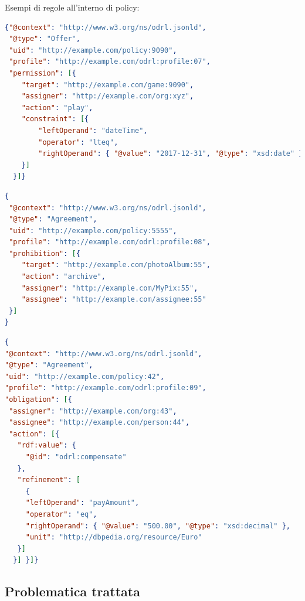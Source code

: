 \documentclass[12pt,a4paper,twoside]{book}
\begin{document}
Esempi di regole all'interno di policy:
\begin{lstlisting}[language=json,firstnumber=1,caption={La regola esprime il permesso di eseguire l'azione \textbf{play} sul target fino al giorno 2017-12-31 compreso},captionpos=b,label=esempioPerm]
{"@context": "http://www.w3.org/ns/odrl.jsonld",
 "@type": "Offer",
 "uid": "http://example.com/policy:9090",
 "profile": "http://example.com/odrl:profile:07",
 "permission": [{
    "target": "http://example.com/game:9090",
    "assigner": "http://example.com/org:xyz",
    "action": "play",
    "constraint": [{
        "leftOperand": "dateTime",
        "operator": "lteq",
        "rightOperand": { "@value": "2017-12-31", "@type": "xsd:date" }
    }]
  }]}
\end{lstlisting}
\begin{lstlisting}[language=json,firstnumber=1,caption={La regola esprime il divieto di eseguire l'azione \textbf{archive} sul target},captionpos=b,label=esempioPro]
{
 "@context": "http://www.w3.org/ns/odrl.jsonld",
 "@type": "Agreement",
 "uid": "http://example.com/policy:5555",
 "profile": "http://example.com/odrl:profile:08",
 "prohibition": [{
	"target": "http://example.com/photoAlbum:55",
	"action": "archive",
	"assigner": "http://example.com/MyPix:55",
	"assignee": "http://example.com/assignee:55"
 }]
}
\end{lstlisting}

\begin{lstlisting}[language=json,firstnumber=1,caption={La regola esprime l'obbligo di eseguire l'azione \textbf{compensate}, specificando come \textbf{refinement} l'ammontare del pagamento},captionpos=b,label=esempioDuty]
{
"@context": "http://www.w3.org/ns/odrl.jsonld",
"@type": "Agreement",
"uid": "http://example.com/policy:42",
"profile": "http://example.com/odrl:profile:09",
"obligation": [{
 "assigner": "http://example.com/org:43",
 "assignee": "http://example.com/person:44",
 "action": [{
   "rdf:value": {
     "@id": "odrl:compensate"
   },
   "refinement": [
     {
     "leftOperand": "payAmount",
     "operator": "eq",
     "rightOperand": { "@value": "500.00", "@type": "xsd:decimal" },
     "unit": "http://dbpedia.org/resource/Euro"
   }]
  }] }]}
\end{lstlisting}
\subsection{Problematica trattata}\label{problematiche}
\end{document}
